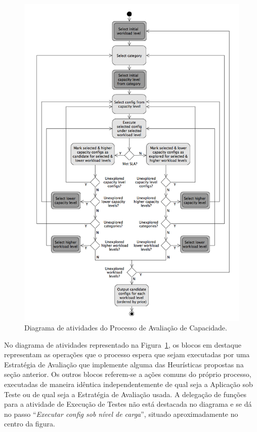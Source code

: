 \begin{figure}
  \begin{center}
    \includegraphics[scale=0.5]{img/capacity-planning-diagram-v13-mono}
  \end{center}
  \caption{\label{fig:fig_processo_aval_capacidade}Diagrama de atividades do Processo de Avaliação de Capacidade.}
\end{figure}


No diagrama de atividades representado na Figura~\ref{fig:fig_processo_aval_capacidade}, os blocos em destaque representam as operações que o processo espera que sejam executadas por uma Estratégia de 
Avaliação que implemente alguma das Heurísticas propostas na seção anterior. Os outros 
blocos referem-se a ações comuns do próprio processo, executadas de maneira 
idêntica independentemente de qual seja a Aplicação sob Teste ou de qual seja a 
Estratégia de Avaliação usada. A delegação de funções para a atividade de Execução
de Testes não está destacada no diagrama e se dá no passo ``\emph{Executar
config sob nível de carga}'', situado aproximadamente no centro da figura.


